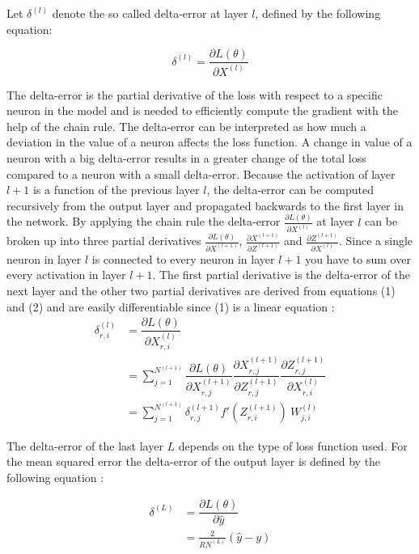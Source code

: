 \documentclass[a4paper, twoside]{article}
\newcommand*{\pd}[2]{\ensuremath{\dfrac{\partial #1}{\partial #2}}}
\newcommand*{\inpd}[2]{\ensuremath{\frac{\partial #1}{\partial #2}}}
\begin{document}
Let $\delta^{(l)}$ denote the so called delta-error at layer $l$, defined by the following equation:

\begin{equation}\label{deltaerrordefinition}
\delta^{(l)} = \inpd{L(\theta)}{X^{(l)}}
\end{equation}

The delta-error is the partial derivative of the loss with respect to a specific neuron in the model and is needed to efficiently compute the gradient with the help of the chain rule. The delta-error can be interpreted as how much a deviation in the value of a neuron affects the loss function. A change in value of a neuron with a big delta-error results in a greater change of the total loss compared to a neuron with a small delta-error. Because the activation of layer $l+1$ is a function of the previous layer $l$, the delta-error can be computed recursively from the output layer and propagated backwards to the first layer in the network. By applying the chain rule the delta-error $\inpd{L(\theta)}{X^{(l)}}$  at layer $l$ can be broken up into three partial derivatives $\inpd{L(\theta)}{X^{(l+1)}}$, $\inpd{X^{(l+1)}}{Z^{(l+1)}}$ and $\inpd{Z^{(l+1)}}{X^{(l)}}$. Since a single neuron in layer $l$ is connected to every neuron in layer $l+1$ you have to sum over every activation in layer $l+1$. The first partial derivative is the delta-error of the next layer and the other two partial derivatives are derived from equations (1) and (2) and are easily differentiable since (1) is a linear equation \cite{cs231n} \cite{wikiStanford}:
\begin{equation}\label{dLdX_FCC}
\begin{split}
\delta^{(l)}_{r,i}
	& = \pd{L(\theta)}{X^{(l)}_{r,i}}  \\
	& = \sum^{N^{(l+1)}}_{j=1} \pd{L(\theta)}{X^{(l+1)}_{r,j}} \pd{X^{(l+1)}_{r,j}}{Z^{(l+1)}_{r,j}} \pd{Z^{(l+1)}_{r,j}}{X^{(l)}_{r,i}} \\
	& = \sum^{N^{(l+1)}}_{j=1} \delta^{(l+1)}_{r,j} f'(Z^{(l+1)}_{r,i}) \ W^{(l)}_{j,i} 
\end{split}
\end{equation}

The delta-error of the last layer $L$ depends on the type of loss function used. For the mean squared error the delta-error of the output layer is defined by the following equation \cite{cs231n} \cite{wikiStanford}:

\begin{equation}\label{MSEdelta}
\begin{split}
\delta^{(L)}
	& = \pd{L(\theta)}{\hat{y}}  \\
	& = \frac{2}{RN^{(L)}} (\hat{y}-y)
\end{split}
\end{equation}
\end{document}
